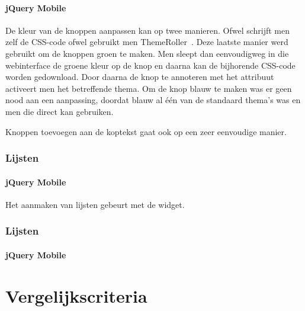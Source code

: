 \paragraph{jQuery Mobile} 
De kleur van de knoppen aanpassen kan op twee manieren. 
Ofwel schrijft men zelf de CSS-code ofwel gebruikt men ThemeRoller~\cite{JQuery2012c}. 
Deze laatste manier werd gebruikt om de knoppen groen te maken. 
Men sleept dan eenvoudigweg in die webinterface de groene kleur op de knop en daarna kan de bijhorende CSS-code worden gedownload. 
Door daarna de knop te annoteren met het  attribuut activeert men het betreffende thema. 
Om de knop blauw te maken was er geen nood aan een aanpassing, doordat blauw al één van de standaard thema's was en men die direct kan gebruiken.

Knoppen toevoegen aan de koptekst gaat ook op een zeer eenvoudige manier.

\subsubsection{Lijsten}

\paragraph{jQuery Mobile} 
Het aanmaken van lijsten gebeurt met de  widget.

\subsubsection{Lijsten}

\paragraph{jQuery Mobile} 


\section{Vergelijkscriteria}
\label{sec:evaluatie-criteria}